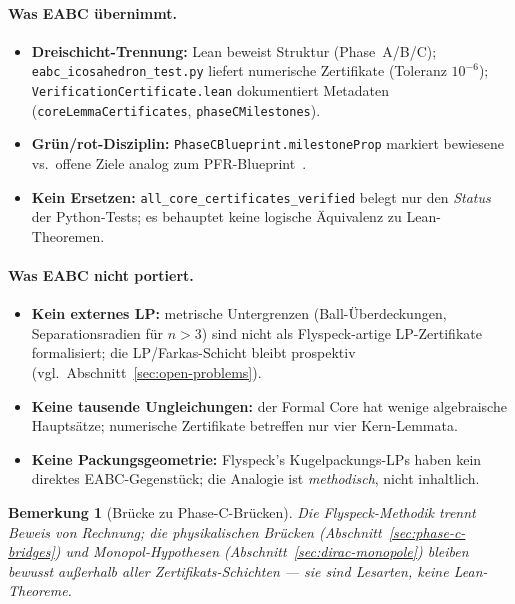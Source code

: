 \documentclass[11pt,a4paper]{article}
\newtheorem{remark}{Bemerkung}
\begin{document}
	\paragraph{Was EABC übernimmt.}
	\begin{itemize}
		\item \textbf{Dreischicht-Trennung:} Lean beweist Struktur (Phase~A/B/C);
		\texttt{eabc\_icosahedron\_test.py} liefert numerische Zertifikate
		(Toleranz $10^{-6}$); \texttt{VerificationCertificate.lean} dokumentiert
		Metadaten (\texttt{coreLemmaCertificates}, \texttt{phaseCMilestones}).
		\item \textbf{Grün/rot-Disziplin:} \texttt{PhaseCBlueprint.milestoneProp} markiert
		bewiesene vs.\ offene Ziele analog zum PFR-Blueprint~\cite{tao-pfr}.
		\item \textbf{Kein Ersetzen:} \texttt{all\_core\_certificates\_verified} belegt nur
		den \emph{Status} der Python-Tests; es behauptet keine logische Äquivalenz
		zu Lean-Theoremen.
	\end{itemize}
	
	\paragraph{Was EABC nicht portiert.}
	\begin{itemize}
		\item \textbf{Kein externes LP:} metrische Untergrenzen (Ball-Überdeckungen,
		Separationsradien für $n>3$) sind nicht als Flyspeck-artige LP-Zertifikate
		formalisiert; die LP/Farkas-Schicht bleibt prospektiv
		(vgl.\ Abschnitt~\ref{sec:open-problems}).
		\item \textbf{Keine tausende Ungleichungen:} der Formal Core hat wenige
		algebraische Hauptsätze; numerische Zertifikate betreffen nur vier Kern-Lemmata.
		\item \textbf{Keine Packungsgeometrie:} Flyspeck's Kugelpackungs-LPs haben kein
		direktes EABC-Gegenstück; die Analogie ist \emph{methodisch}, nicht inhaltlich.
	\end{itemize}
	
	\begin{remark}[Brücke zu Phase-C-Brücken]
		Die Flyspeck-Methodik trennt Beweis von Rechnung; die physikalischen Brücken
		(Abschnitt~\ref{sec:phase-c-bridges}) und Monopol-Hypothesen
		(Abschnitt~\ref{sec:dirac-monopole}) bleiben bewusst außerhalb aller
		Zertifikats-Schichten --- sie sind Lesarten, keine Lean-Theoreme.
	\end{remark}
	
\end{document}
